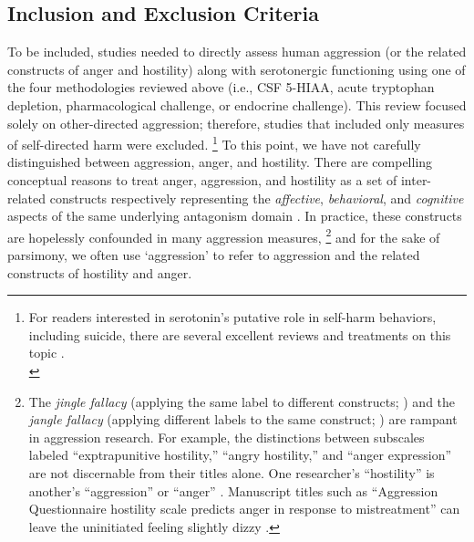 \subsection{Inclusion and Exclusion Criteria}
To be included, studies needed to directly assess human aggression (or the related constructs of anger and hostility) along with serotonergic functioning using one of the four methodologies reviewed above (i.e., CSF 5-HIAA, acute tryptophan depletion, pharmacological challenge, or endocrine challenge). This review focused solely on other-directed aggression; therefore, studies that included only measures of self-directed harm were excluded.%
\footnote{For readers interested in serotonin's putative role in self-harm behaviors, including suicide, there are several excellent reviews and treatments on this topic \parencite[e.g.,][]{Lester1995, Mueller2004, Desmyter2011}.\\} 
To this point, we have not carefully distinguished between aggression, anger, and hostility. There are compelling conceptual reasons to treat anger, aggression, and hostility as a set of inter-related constructs respectively representing the \emph{affective}, \emph{behavioral}, and \emph{cognitive} aspects of the same underlying antagonism domain \parencite[see][]{Martin2000}. In practice, these constructs are hopelessly confounded in many aggression measures,%
\footnote{
The \emph{jingle fallacy} (applying the same label to different constructs; ) and the \emph{jangle fallacy} (applying different labels to the same construct; ) are rampant in aggression research. For example, the distinctions between subscales labeled ``exptrapunitive hostility,'' ``angry hostility,'' and ``anger expression'' are not discernable from their titles alone. One researcher's ``hostility'' is another's ``aggression'' or ``anger'' \parencite[e.g.,][]{Buchanan1999, Bushman2001p, Tremblay1991}. Manuscript titles such as ``Aggression Questionnaire hostility scale predicts anger in response to mistreatment'' can leave the uninitiated feeling slightly dizzy \parencite{Felsten1999}.} 
and for the sake of parsimony, we often use `aggression' to refer to aggression and the related constructs of hostility and anger.   


